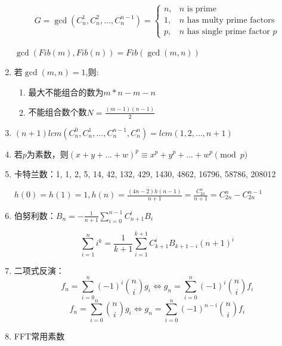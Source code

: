\documentclass[twoside]{article}
\begin{document}
\begin{enumerate}
$$
G=\gcd(C_n^1,C_n^2,...,C_n^{n-1})=
\begin{cases}
	n, & \text{$n$ is prime} \\
	1, & \text{$n$ has multy prime factors} \\
	p, & \text{$n$ has single prime factor $p$}
\end{cases}
$$

$\gcd(Fib(m),Fib(n))=Fib(\gcd(m,n))$

\item 若$\gcd(m,n)=1$,则:

\begin{enumerate}
\item 最大不能组合的数为$m*n-m-n$
\item 不能组合数个数$N=\frac{(m-1)(n-1)}{2}$
\end{enumerate}

\item $(n+1)lcm(C_n^0,C_n^1,...,C_n^{n-1},C_n^{n})=lcm(1,2,...,n+1)$

\item 若$p$为素数，则$(x+y+...+w)^p\equiv x^p+y^p+...+w^p\pmod p$

\item 卡特兰数：1, 1, 2, 5, 14, 42, 132, 429, 1430, 4862, 16796, 58786, 208012

$h(0)=h(1)=1,h(n)=\frac{(4n-2)h(n-1)}{n+1}=\frac{C_{2n}^n}{n+1}=C_{2n}^n-C_{2n}^{n-1}$

\item 伯努利数：$B_n = -\frac{1}{n+1} \sum_{i=0}^{n-1} C_{n+1}^i B_i$

$$\sum_{i=1}^n i^k = \frac{1}{k+1} \sum_{i=1}^{k+1}C_{k+1}^i B_{k+1-i}(n+1)^i$$

\item 二项式反演：$$f_n = \sum_{i = 0} ^ n (-1) ^ i \binom{n}{i} g_i \Leftrightarrow g_n = \sum_{i = 0} ^ n (-1) ^ i \binom{n}{i} f_i$$
$$f_n = \sum_{i = 0} ^ n \binom{n}{i} g_i \Leftrightarrow g_n = \sum_{i = 0} ^ n (-1) ^ {n - i} \binom{n}{i} f_i$$


\item FFT常用素数


\end{enumerate}
\end{document}

